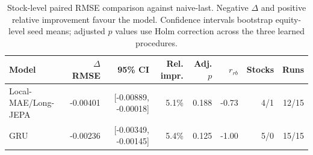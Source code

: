 \begin{table}[t]
\centering
\small
\caption{Stock-level paired RMSE comparison against naive-last. Negative $\Delta$ and positive relative improvement favour the model. Confidence intervals bootstrap equity-level seed means; adjusted $p$ values use Holm correction across the three learned procedures.}
\label{tab:paired_rmse_naive}
\begin{tabular}{lrrrrrrr}
\toprule
Model & $\Delta$RMSE & 95\% CI & Rel. impr. & Adj. $p$ & $r_{rb}$ & Stocks & Runs \\
\midrule
Local-MAE/Long-JEPA & -0.00401 & [-0.00889, -0.00018] & 5.1\% & 0.188 & -0.73 & 4/1 & 12/15 \\
GRU & -0.00236 & [-0.00349, -0.00145] & 5.4\% & 0.125 & -1.00 & 5/0 & 15/15 \\
\bottomrule
\end{tabular}
\end{table}

